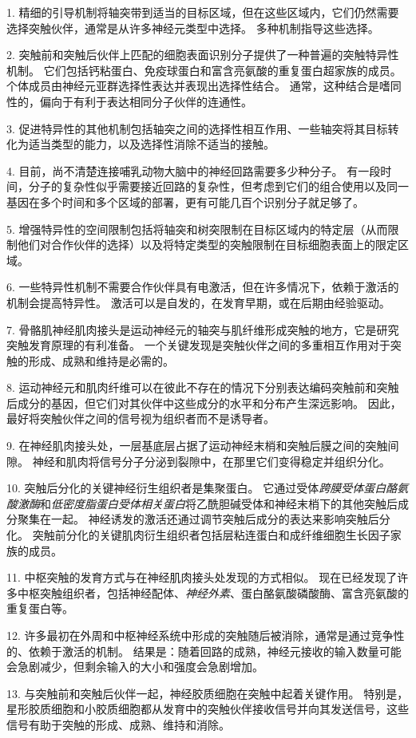1. 精细的引导机制将轴突带到适当的目标区域，但在这些区域内，它们仍然需要选择突触伙伴，通常是从许多神经元类型中选择。
多种机制指导这些选择。


2. 突触前和突触后伙伴上匹配的细胞表面识别分子提供了一种普遍的突触特异性机制。
它们包括钙粘蛋白、免疫球蛋白和富含亮氨酸的重复蛋白超家族的成员。
个体成员由神经元亚群选择性表达并表现出选择性结合。
通常，这种结合是嗜同性的，偏向于有利于表达相同分子伙伴的连通性。


3. 促进特异性的其他机制包括轴突之间的选择性相互作用、一些轴突将其目标转化为适当类型的能力，以及选择性消除不适当的接触。


4. 目前，尚不清楚连接哺乳动物大脑中的神经回路需要多少种分子。
有一段时间，分子的复杂性似乎需要接近回路的复杂性，但考虑到它们的组合使用以及同一基因在多个时间和多个区域的部署，更有可能几百个识别分子就足够了。


5. 增强特异性的空间限制包括将轴突和树突限制在目标区域内的特定层（从而限制他们对合作伙伴的选择）以及将特定类型的突触限制在目标细胞表面上的限定区域。


6. 一些特异性机制不需要合作伙伴具有电激活，但在许多情况下，依赖于激活的机制会提高特异性。
激活可以是自发的，在发育早期，或在后期由经验驱动。 


7. 骨骼肌神经肌肉接头是运动神经元的轴突与肌纤维形成突触的地方，它是研究突触发育原理的有利准备。
一个关键发现是突触伙伴之间的多重相互作用对于突触的形成、成熟和维持是必需的。


8. 运动神经元和肌肉纤维可以在彼此不存在的情况下分别表达编码突触前和突触后成分的基因，但它们对其伙伴中这些成分的水平和分布产生深远影响。
因此，最好将突触伙伴之间的信号视为组织者而不是诱导者。


9. 在神经肌肉接头处，一层基底层占据了运动神经末梢和突触后膜之间的突触间隙。
神经和肌肉将信号分子分泌到裂隙中，在那里它们变得稳定并组织分化。


10. 突触后分化的关键神经衍生组织者是集聚蛋白。
它通过受体\textit{跨膜受体蛋白酪氨酸激酶}和\textit{低密度脂蛋白受体相关蛋白}将乙酰胆碱受体和神经末梢下的其他突触后成分聚集在一起。
神经诱发的激活还通过调节突触后成分的表达来影响突触后分化。
突触前分化的关键肌肉衍生组织者包括层粘连蛋白和成纤维细胞生长因子家族的成员。


11. 中枢突触的发育方式与在神经肌肉接头处发现的方式相似。
现在已经发现了许多中枢突触组织者，包括神经配体、\textit{神经外素}、蛋白酪氨酸磷酸酶、富含亮氨酸的重复蛋白等。


12. 许多最初在外周和中枢神经系统中形成的突触随后被消除，通常是通过竞争性的、依赖于激活的机制。
结果是：随着回路的成熟，神经元接收的输入数量可能会急剧减少，但剩余输入的大小和强度会急剧增加。


13. 与突触前和突触后伙伴一起，神经胶质细胞在突触中起着关键作用。
特别是，星形胶质细胞和小胶质细胞都从发育中的突触伙伴接收信号并向其发送信号，这些信号有助于突触的形成、成熟、维持和消除。



